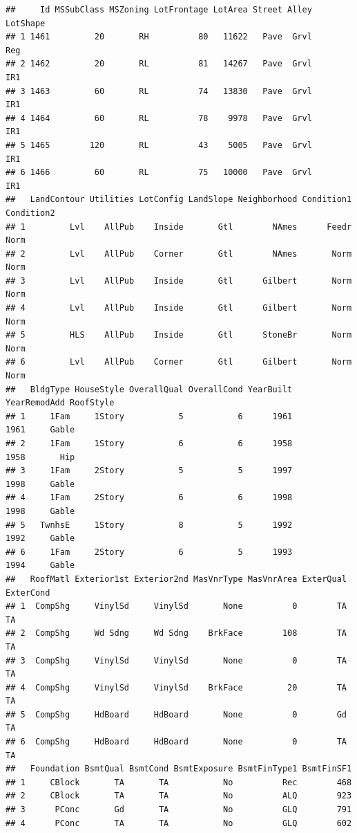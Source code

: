 \documentclass[
]{article}
\begin{document}
\begin{verbatim}
##     Id MSSubClass MSZoning LotFrontage LotArea Street Alley LotShape
## 1 1461         20       RH          80   11622   Pave  Grvl      Reg
## 2 1462         20       RL          81   14267   Pave  Grvl      IR1
## 3 1463         60       RL          74   13830   Pave  Grvl      IR1
## 4 1464         60       RL          78    9978   Pave  Grvl      IR1
## 5 1465        120       RL          43    5005   Pave  Grvl      IR1
## 6 1466         60       RL          75   10000   Pave  Grvl      IR1
##   LandContour Utilities LotConfig LandSlope Neighborhood Condition1 Condition2
## 1         Lvl    AllPub    Inside       Gtl        NAmes      Feedr       Norm
## 2         Lvl    AllPub    Corner       Gtl        NAmes       Norm       Norm
## 3         Lvl    AllPub    Inside       Gtl      Gilbert       Norm       Norm
## 4         Lvl    AllPub    Inside       Gtl      Gilbert       Norm       Norm
## 5         HLS    AllPub    Inside       Gtl      StoneBr       Norm       Norm
## 6         Lvl    AllPub    Corner       Gtl      Gilbert       Norm       Norm
##   BldgType HouseStyle OverallQual OverallCond YearBuilt YearRemodAdd RoofStyle
## 1     1Fam     1Story           5           6      1961         1961     Gable
## 2     1Fam     1Story           6           6      1958         1958       Hip
## 3     1Fam     2Story           5           5      1997         1998     Gable
## 4     1Fam     2Story           6           6      1998         1998     Gable
## 5   TwnhsE     1Story           8           5      1992         1992     Gable
## 6     1Fam     2Story           6           5      1993         1994     Gable
##   RoofMatl Exterior1st Exterior2nd MasVnrType MasVnrArea ExterQual ExterCond
## 1  CompShg     VinylSd     VinylSd       None          0        TA        TA
## 2  CompShg     Wd Sdng     Wd Sdng    BrkFace        108        TA        TA
## 3  CompShg     VinylSd     VinylSd       None          0        TA        TA
## 4  CompShg     VinylSd     VinylSd    BrkFace         20        TA        TA
## 5  CompShg     HdBoard     HdBoard       None          0        Gd        TA
## 6  CompShg     HdBoard     HdBoard       None          0        TA        TA
##   Foundation BsmtQual BsmtCond BsmtExposure BsmtFinType1 BsmtFinSF1
## 1     CBlock       TA       TA           No          Rec        468
## 2     CBlock       TA       TA           No          ALQ        923
## 3      PConc       Gd       TA           No          GLQ        791
## 4      PConc       TA       TA           No          GLQ        602

\end{verbatim}
\end{document}

